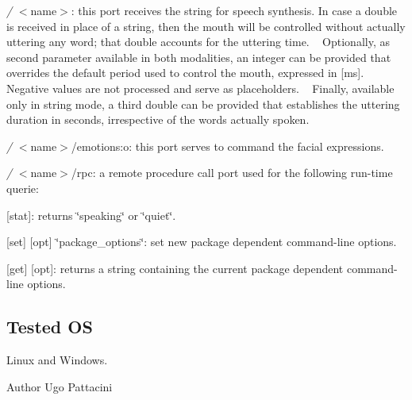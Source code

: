 \begin{DoxyItemize}
\item {\itshape /} $<$name$>$\+: this port receives the string for speech synthesis. In case a double is received in place of a string, then the mouth will be controlled without actually uttering any word; that double accounts for the uttering time. ~\newline
 Optionally, as second parameter available in both modalities, an integer can be provided that overrides the default period used to control the mouth, expressed in \mbox{[}ms\mbox{]}. Negative values are not processed and serve as placeholders. ~\newline
 Finally, available only in string mode, a third double can be provided that establishes the uttering duration in seconds, irrespective of the words actually spoken.
\item {\itshape /} $<$name$>$/emotions\+:o\+: this port serves to command the facial expressions.
\item {\itshape /} $<$name$>$/rpc\+: a remote procedure call port used for the following run-\/time querie\+: ~\newline

\begin{DoxyItemize}
\item \mbox{[}stat\mbox{]}\+: returns \char`\"{}speaking\char`\"{} or \char`\"{}quiet\char`\"{}.
\item \mbox{[}set\mbox{]} \mbox{[}opt\mbox{]} \char`\"{}package\+\_\+options\char`\"{}\+: set new package dependent command-\/line options.
\item \mbox{[}get\mbox{]} \mbox{[}opt\mbox{]}\+: returns a string containing the current package dependent command-\/line options.
\end{DoxyItemize}
\end{DoxyItemize}\hypertarget{group__windows-tts_tested_os_sec}{}\subsection{Tested O\+S}\label{group__windows-tts_tested_os_sec}
Linux and Windows.

\begin{DoxyAuthor}{Author}
Ugo Pattacini 
\end{DoxyAuthor}

